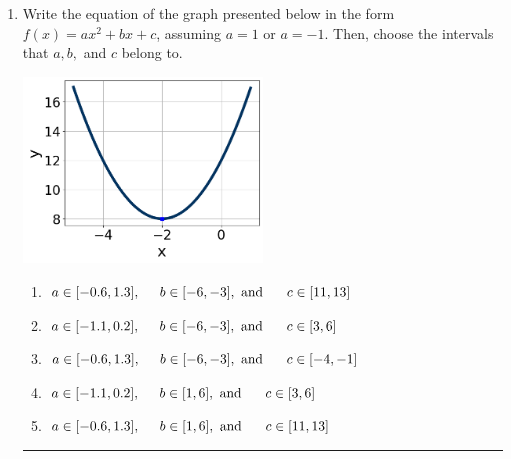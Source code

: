 \documentclass[14pt]{extbook}
\newcommand{\litem}[1]{\item#1\hspace*{-1cm}\rule{\textwidth}{0.4pt}}
\begin{document}
\begin{enumerate}
{\begin{enumerate}[label=\Alph*.]
\end{enumerate} }
\litem{
Write the equation of the graph presented below in the form $f(x)=ax^2+bx+c$, assuming  $a=1$ or $a=-1$. Then, choose the intervals that $a, b,$ and $c$ belong to.
\begin{center}
    \includegraphics[width=0.5\textwidth]{../Figures/quadraticGraphToEquationA.png}
\end{center}
\begin{enumerate}[label=\Alph*.]
\item \( a \in [-0.6, 1.3], \hspace*{5mm} b \in [-6, -3], \text{ and } \hspace*{5mm} c \in [11, 13] \)
\item \( a \in [-1.1, 0.2], \hspace*{5mm} b \in [-6, -3], \text{ and } \hspace*{5mm} c \in [3, 6] \)
\item \( a \in [-0.6, 1.3], \hspace*{5mm} b \in [-6, -3], \text{ and } \hspace*{5mm} c \in [-4, -1] \)
\item \( a \in [-1.1, 0.2], \hspace*{5mm} b \in [1, 6], \text{ and } \hspace*{5mm} c \in [3, 6] \)
\item \( a \in [-0.6, 1.3], \hspace*{5mm} b \in [1, 6], \text{ and } \hspace*{5mm} c \in [11, 13] \)


\end{enumerate}}
\end{enumerate}
\end{document}
